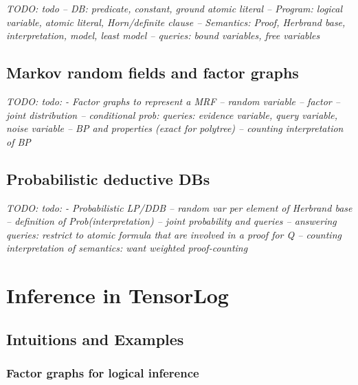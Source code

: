 \documentclass[12pt]{article}
\newcommand{\yy}[1]{\textit{TODO: {#1}}}
\begin{document}
\yy{todo 
 -- DB: predicate, constant, ground atomic literal 
 -- Program: logical variable, atomic literal, Horn/definite clause 
 -- Semantics: Proof, Herbrand base, interpretation, model, least model
 -- queries: bound variables, free variables 
}

\subsection{Markov random fields and factor graphs}

\yy{todo:
- Factor graphs to represent a MRF
 -- random variable
 -- factor 
 -- joint distribution
 -- conditional prob: queries: evidence variable, query variable, noise variable
 -- BP and properties (exact for polytree)
 -- counting interpretation of BP
}

\subsection{Probabilistic deductive DBs}

\yy{todo:
- Probabilistic LP/DDB
 -- random var per element of Herbrand base
 -- definition of Prob(interpretation)
 -- joint probability and queries
 -- answering queries: restrict to atomic formula that are involved in a proof for Q
 -- counting interpretation of semantics: want weighted proof-counting
}

\section{Inference in TensorLog}

\subsection{Intuitions and Examples}

\subsubsection{Factor graphs for logical inference}
\end{document}

